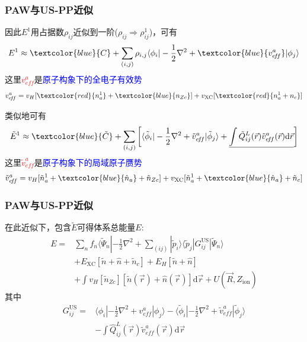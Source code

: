 {\frame
{
	\frametitle{\textrm{PAW}与\textrm{US-PP}近似}
	因此$E^1$用占据数$\rho_{ij}$近似到一阶($\rho_{ij}\Rightarrow\rho_{ij}^1$)，可有
	\begin{displaymath}
		E^1\approx\textcolor{blue}{C}+\sum_{(i,j)}\rho_{i,j}\langle\phi_i|-\frac12\nabla^2+\textcolor{blue}{v_{e\!f\!f}^a}|\phi_j\rangle
	\end{displaymath}
	这里\textcolor{red}{$v_{e\!f\!f}^a$}是\textcolor{blue}{原子构象下的全电子有效势}
	\begin{displaymath}
		v_{e\!f\!f}^a=v_H[\textcolor{red}{n_a^1}+\textcolor{blue}{n_{Zc}}]+v_{\mathrm{XC}}[\textcolor{red}{n_a^1+n_c}]
	\end{displaymath}

	类似地可有
	\begin{displaymath}
		\tilde E^1\approx\textcolor{blue}{\tilde C}+\sum_{(i,j)}\left[\langle\tilde\phi_i|-\frac12\nabla^2+\tilde v_{e\!f\!f}^a|\tilde\phi_j\rangle+\underline{\int\tilde Q_{ij}^L(\vec r)\tilde v_{e\!f\!f}^a(\vec r)\mathrm{d}\vec r}\right]
	\end{displaymath}
	这里\textcolor{red}{$\tilde v_{e\!f\!f}^a$}是\textcolor{blue}{原子构象下的局域原子赝势}
	$$\tilde v_{e\!f\!f}^a=v_H[\tilde n_a^1+\textcolor{blue}{\hat n_a}+\tilde n_{Zc}]+v_{\mathrm{XC}}[\tilde n_a^1+\textcolor{blue}{\hat n_a}+\tilde n_c]$$
}

\frame
{
	\frametitle{\textrm{PAW}与\textrm{US-PP}近似}
	在此近似下，包含$\tilde E$可得体系总能量$E$:
	\begin{displaymath}
		\begin{aligned}
			E=&\sum_nf_n\langle\tilde\Psi_n|-\frac12\nabla^2+\sum_{(ij)}|\tilde p_i\rangle\langle\tilde p_j|G_{ij}^{\mathrm{US}}|\tilde\Psi_n\rangle\\
			&+E_{\mathrm{XC}}[\tilde n+\hat n+\tilde n_c]+E_H[\tilde n+\hat n]\\
			&+\int v_H[\tilde n_{Zc}][\tilde n(\vec r)+\hat n(\vec r)]\mathrm{d}\vec r+U(\vec R,Z_{\mathrm{ion}})
		\end{aligned}
	\end{displaymath}
	其中
	\begin{displaymath}
		\begin{aligned}
			G_{ij}^{\mathrm{US}}=&\langle\phi_i|-\frac12\nabla^2+v_{e\!f\!f}^a|\phi_j\rangle-\langle\tilde\phi_i|-\frac12\nabla^2+\tilde v_{e\!f\!f}^a|\tilde\phi_j\rangle\\
			&-\int\hat Q_{ij}^L(\vec r)\tilde v_{e\!f\!f}^a(\vec r)\mathrm{d}\vec r
		\end{aligned}
	\end{displaymath}
}


}

